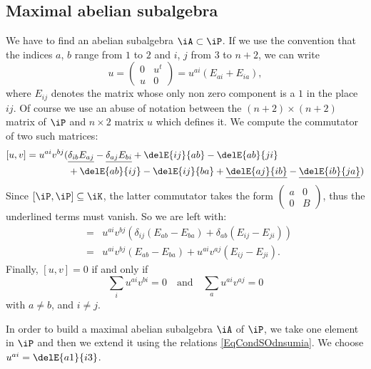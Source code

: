 \subsection{Maximal abelian subalgebra}

We have to find an abelian subalgebra $\iA\subset\iP$. If we use the convention that the indices $a$, $b$ range from $1$ to $2$ and $i$, $j$ from $3$ to $n+2$, we can write
\begin{equation}
    u=\begin{pmatrix}
0 & u^t \\
u & 0
\end{pmatrix}=u^{ai}(E_{ai}+E_{ia}),
\end{equation}
where $E_{ij}$ denotes the matrix whose only non zero component is a $1$ in the place $ij$. Of course we use an abuse of notation between the $(n+2)\times(n+2)$ matrix of $\iP$ and $n\times 2$ matrix $u$ which defines it. We compute the commutator of two such matrices:
\begin{equation}
\begin{split}
[u,v]=u^{ai}v^{bj}(&\underline{\delta_{ib}E_{aj}}-\underline{\delta_{aj}E_{bi}}+\delE{ij}{ab}-\delE{ab}{ji}\\
&+ \delE{ab}{ij}-\delE{ij}{ba}+\underline{\delE{aj}{ib}}-\underline{\delE{ib}{ja}})
\end{split}
\end{equation}
Since $[\iP,\iP]\subseteq\iK$, the latter commutator takes the form $\begin{pmatrix}
a & 0 \\
0 & B
\end{pmatrix}$, thus the underlined terms must vanish. So we are left with:
\begin{eqnarray}
[u,v]&=&u^{ai}v^{bj}(\delta_{ij}(E_{ab}-E_{ba})+\delta_{ab}(E_{ij}-E_{ji}))\\
     &=&u^{ai}v^{bj} (E_{ab}-E_{ba})+u^{ai}v^{aj} (E_{ij}-E_{ji}).
\end{eqnarray}
Finally, $[u,v]=0$ if and only if 
\begin{equation} \label{EqCondSOdnsumia}
\sum_iu^{ai}v^{bi}=0\quad\text{and}\quad \sum_au^{ai}v^{aj}=0
\end{equation}
 with $a\neq b$, and $i\neq j$.

In order to build a maximal abelian subalgebra $\iA$ of $\iP$, we take one element in $\iP$ and then we extend it using the relations \eqref{EqCondSOdnsumia}. We choose $u^{ai}=\delE{a1}{i3}$.

